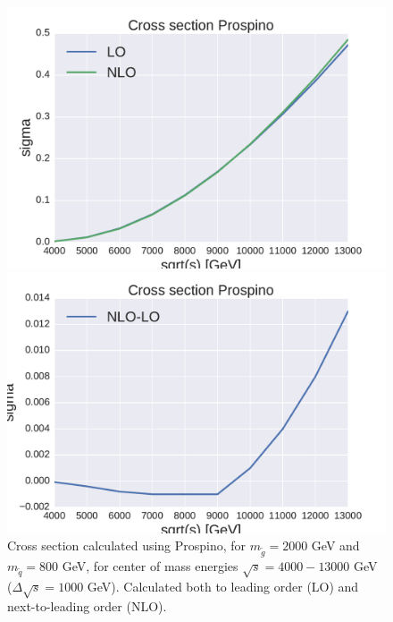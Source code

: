 \documentclass[11pt]{article}
\begin{document}
\begin{figure}[H]
\centering

\begin{minipage}{.5\textwidth}
  \centering
  \includegraphics[width=1.1\linewidth]{plots/prospino_2000_800_tester.pdf}
\end{minipage}%
\begin{minipage}{.5\textwidth}
  \centering
  \includegraphics[width=1.1\linewidth]{plots/prospino_2000_800_tester_diff.pdf}
\end{minipage}

\caption{Cross section calculated using Prospino, for $m_{\tilde{g}}=2000$ GeV and $m_{\tilde{q}}=800$ GeV, for center of mass energies $\sqrt{s}=4000-13000$ GeV ($\Delta \sqrt{s}=1000$ GeV). Calculated both to leading order (LO) and next-to-leading order (NLO).}
\label{fig:: sigma 2000-800 LO og NLO}
\end{figure}
\end{document}
